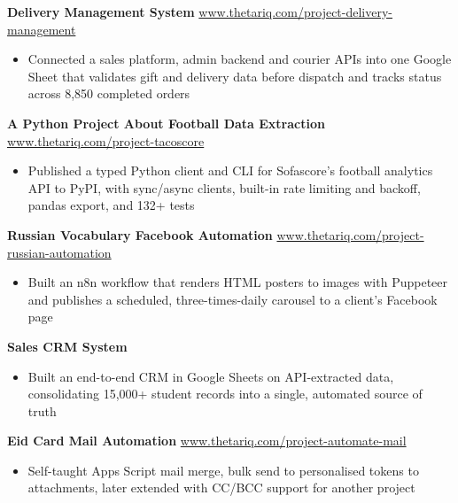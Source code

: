 \documentclass[11pt]{article}
\begin{document}
\textbf{Delivery Management System} \hfill \href{https://www.thetariq.com/project-delivery-management.html}{www.thetariq.com/project-delivery-management}
\begin{itemize}[noitemsep, topsep=0pt, partopsep=0pt, parsep=0pt]
    \item Connected a sales platform, admin backend and courier APIs into one Google Sheet that validates gift and delivery data before dispatch and tracks status across 8,850 completed orders
\end{itemize}

\vspace{3pt}

\textbf{A Python Project About Football Data Extraction} \hfill \href{https://www.thetariq.com/project-tacoscore.html}{www.thetariq.com/project-tacoscore}
\begin{itemize}[noitemsep, topsep=0pt, partopsep=0pt, parsep=0pt]
    \item Published a typed Python client and CLI for Sofascore's football analytics API to PyPI, with sync/async clients, built-in rate limiting and backoff, pandas export, and 132+ tests
\end{itemize}

\vspace{3pt}

\textbf{Russian Vocabulary Facebook Automation} \hfill \href{https://www.thetariq.com/project-russian-automation.html}{www.thetariq.com/project-russian-automation}
\begin{itemize}[noitemsep, topsep=0pt, partopsep=0pt, parsep=0pt]
    \item Built an n8n workflow that renders HTML posters to images with Puppeteer and publishes a scheduled, three-times-daily carousel to a client's Facebook page
\end{itemize}

\vspace{3pt}

\textbf{Sales CRM System}
\begin{itemize}[noitemsep, topsep=0pt, partopsep=0pt, parsep=0pt]
    \item Built an end-to-end CRM in Google Sheets on API-extracted data, consolidating 15,000+ student records into a single, automated source of truth
\end{itemize}

\vspace{3pt}

\textbf{Eid Card Mail Automation} \hfill \href{https://www.thetariq.com/project-automate-mail.html}{www.thetariq.com/project-automate-mail}
\begin{itemize}[noitemsep, topsep=0pt, partopsep=0pt, parsep=0pt]
    \item Self-taught Apps Script mail merge, bulk send to personalised tokens to attachments, later extended with CC/BCC support for another project
\end{itemize}
\end{document}
